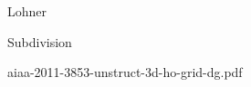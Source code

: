 \documentclass{article}
\begin{document}
Lohner\cite{lohner-regridding-surface}

Subdivision\cite{haimes-imr15-subdivision}

\cite{kim-takano-nakahashi-adjoint-adapt,kim-nakahashi-adjoint-adapt-viscous}

aiaa-2011-3853-unstruct-3d-ho-grid-dg.pdf



\end{document}
